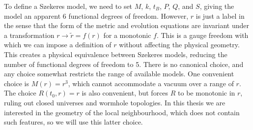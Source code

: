 \documentclass[a4paper,12pt]{report}
\begin{document}
To define a Szekeres model, we need to set $M$, $k$, $t_B$, $P$, $Q$, and $S$, giving the model an apparent 6 functional degrees of freedom. However, $r$ is just a label in the sense that the form of the metric and evolution equations are invariant under a transformation $r \to \tilde{r}=f(r)$ for a monotonic $f$. This is a gauge freedom with which we can impose a definition of $r$ without affecting the physical geometry. This creates a physical equivalence between Szekeres models, reducing the number of functional degrees of freedom to 5. There is no canonical choice, and any choice somewhat restricts the range of available models. One convenient choice is $M(r)=r^3$, which cannot accommodate a vacuum over a range of $r$. The choice $R(t_0,r)=r$ is also convenient, but forces $R$ to be monotonic in $r$, ruling out closed universes and wormhole topologies. In this thesis we are interested in the geometry of the local neighbourhood, which does not contain such features, so we will use this latter choice.
\end{document}
